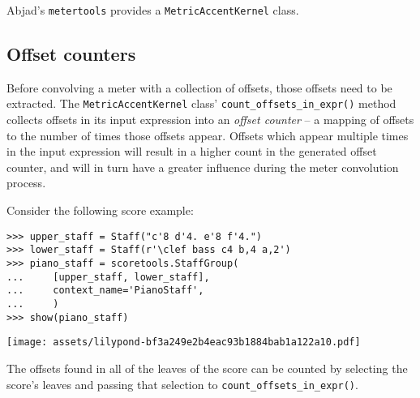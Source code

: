 Abjad's \texttt{metertools} provides a \texttt{MetricAccentKernel} class.

\subsection{Offset counters} %

Before convolving a meter with a collection of offsets, those offsets need to
be extracted. The \texttt{MetricAccentKernel} class'
\texttt{count\_offsets\_in\_expr()} method collects offsets in its input
expression into an \emph{offset counter} -- a mapping of offsets to the number
of times those offsets appear. Offsets which appear multiple times in the input
expression will result in a higher count in the generated offset counter, and
will in turn have a greater influence during the meter convolution process.

Consider the following score example:

\begin{comment}
<abjad>
upper_staff = Staff("c'8 d'4. e'8 f'4.")
lower_staff = Staff(r'\clef bass c4 b,4 a,2')
piano_staff = scoretools.StaffGroup(
    [upper_staff, lower_staff],
    context_name='PianoStaff',
    )
show(piano_staff)
</abjad>
\end{comment}

\begin{singlespacing}
\vspace{-0.5\baselineskip}
\begin{lstlisting}
>>> upper_staff = Staff("c'8 d'4. e'8 f'4.")
>>> lower_staff = Staff(r'\clef bass c4 b,4 a,2')
>>> piano_staff = scoretools.StaffGroup(
...     [upper_staff, lower_staff],
...     context_name='PianoStaff',
...     )
>>> show(piano_staff)
\end{lstlisting}
\noindent\texttt{[image: assets/lilypond-bf3a249e2b4eac93b1884bab1a122a10.pdf]}
\end{singlespacing}

\noindent The offsets found in all of the leaves of the score can be counted by
selecting the score's leaves and passing that selection to
\texttt{count\_offsets\_in\_expr()}.

\begin{comment}
<abjad>
leaves = piano_staff.select_leaves(allow_discontiguous_leaves=True)
piano_staff_counter = metertools.MetricAccentKernel.count_offsets_in_expr(
    leaves)
for offset, count in sorted(piano_staff_counter.items()):
    offset, count

</abjad>
\end{comment}


